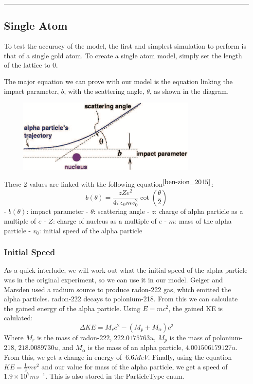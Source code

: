 \documentclass[11pt]{article}
\begin{document}
\begin{center}\rule{0.5\linewidth}{0.5pt}\end{center}

\hypertarget{single-atom}{%
\subsection{Single Atom}\label{single-atom}}

To test the accuracy of the model, the first and simplest simulation to
perform is that of a single gold atom. To create a single atom model,
simply set the length of the lattice to 0.

The major equation we can prove with our model is the equation linking
the impact parameter, \(b\), with the scattering angle, \(\theta\), as
shown in the diagram.

\quad
\begin{figure}[!ht]
	\centering
	\includegraphics[width=0.8\textwidth]{../images/impactParam.png}
\end{figure}

These 2 values are linked with the following equation$^{\cite{ben-zion_2015}}$:
\[ b(\theta) = \frac{zZe^{2}}{4\pi \epsilon_{0} mv_{0}^{2}}\cot(\frac{\theta}{2}) \]
- \(b(\theta)\): impact parameter - \(\theta\): scattering angle -
\(z\): charge of alpha particle as a multiple of \(e\) - \(Z\): charge
of nucleus as a multiple of \(e\) - \(m\): mass of the alpha particle -
\(v_{0}\): initial speed of the alpha particle

\hypertarget{initial-speed}{%
\subsubsection*{Initial Speed}\label{initial-speed}}

As a quick interlude, we will work out what the initial speed of the
alpha particle was in the original experiment, so we can use it in our
model. Geiger and Marsden used a radium source to produce radon-222 gas,
which emitted the alpha particles. radon-222 decays to polonium-218.
From this we can calculate the gained energy of the alpha particle.
Using \(E=mc^{2}\), the gained KE is calulated:
\[ \Delta KE = M_{r}c^{2} - (M_{p}+M_{\alpha})c^{2} \] Where \(M_{r}\)
is the mass of radon-222, \(222.0175763u\), \(M_{p}\) is the mass of
polonium-218, \(218.0089730u\), and \(M_{\alpha}\) is the mass of an
alpha particle, \(4.001506179127u\). From this, we get a change in
energy of \(~6.6MeV\). Finally, using the equation
\(KE = \frac{1}{2}mv^{2}\) and our value for mass of the alpha particle,
we get a speed of \(1.9\times 10^{7}ms^{-1}\). This is also stored in
the ParticleType enum.
\end{document}
